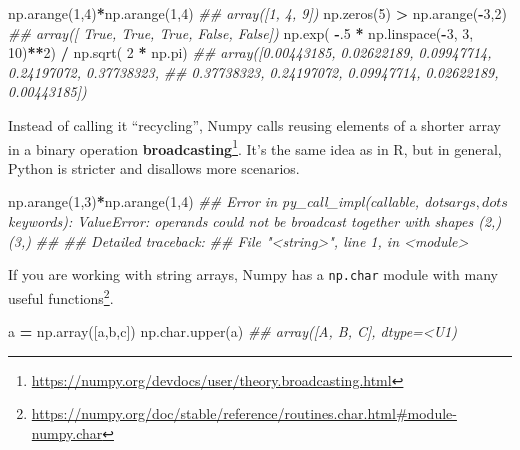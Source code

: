 \documentclass[
  12pt,
]{krantz}
\makeatletter
\newenvironment{Shaded}{\begin{snugshade}}{\end{snugshade}}
\newcommand{\CommentTok}[1]{\textcolor[rgb]{0.37,0.37,0.37}{\textit{#1}}}
\newcommand{\DecValTok}[1]{\textcolor[rgb]{0.06,0.06,0.06}{#1}}
\newcommand{\FloatTok}[1]{\textcolor[rgb]{0.06,0.06,0.06}{#1}}
\newcommand{\NormalTok}[1]{#1}
\newcommand{\OperatorTok}[1]{\textcolor[rgb]{0.43,0.43,0.43}{\textbf{#1}}}
\newcommand{\StringTok}[1]{\textcolor[rgb]{0.5,0.5,0.5}{#1}}
\renewcommand{\href}[2]{#2\footnote{\url{#1}}}
\newenvironment{kframe}{%
\medskip{}
\setlength{\fboxsep}{.8em}
 \def\at@end@of@kframe{}%
 \ifinner\ifhmode%
  \def\at@end@of@kframe{\end{minipage}}%
  \begin{minipage}{\columnwidth}%
 \fi\fi%
 \def\FrameCommand##1{\hskip\@totalleftmargin \hskip-\fboxsep
 \colorbox{shadecolor}{##1}\hskip-\fboxsep
     \hskip-\linewidth \hskip-\@totalleftmargin \hskip\columnwidth}%
 \MakeFramed {\advance\hsize-\width
   \@totalleftmargin\z@ \linewidth\hsize
   \@setminipage}}%
 {\par\unskip\endMakeFramed%
 \at@end@of@kframe}
\renewenvironment{Shaded}{\begin{kframe}}{\end{kframe}}
\makeatother
\begin{document}
\begin{Shaded}
\begin{Highlighting}[]
\NormalTok{np.arange(}\DecValTok{1}\NormalTok{,}\DecValTok{4}\NormalTok{)}\OperatorTok{*}\NormalTok{np.arange(}\DecValTok{1}\NormalTok{,}\DecValTok{4}\NormalTok{)}
\CommentTok{\#\# array([1, 4, 9])}
\NormalTok{np.zeros(}\DecValTok{5}\NormalTok{) }\OperatorTok{\textgreater{}}\NormalTok{ np.arange(}\OperatorTok{{-}}\DecValTok{3}\NormalTok{,}\DecValTok{2}\NormalTok{)}
\CommentTok{\#\# array([ True,  True,  True, False, False])}
\NormalTok{np.exp( }\OperatorTok{{-}}\FloatTok{.5} \OperatorTok{*}\NormalTok{ np.linspace(}\OperatorTok{{-}}\DecValTok{3}\NormalTok{, }\DecValTok{3}\NormalTok{, }\DecValTok{10}\NormalTok{)}\OperatorTok{**}\DecValTok{2}\NormalTok{) }\OperatorTok{/}\NormalTok{ np.sqrt( }\DecValTok{2} \OperatorTok{*}\NormalTok{ np.pi)}
\CommentTok{\#\# array([0.00443185, 0.02622189, 0.09947714, 0.24197072, 0.37738323,}
\CommentTok{\#\#        0.37738323, 0.24197072, 0.09947714, 0.02622189, 0.00443185])}
\end{Highlighting}
\end{Shaded}

Instead of calling it ``recycling'', Numpy calls reusing elements of a shorter array in a binary operation \href{https://numpy.org/devdocs/user/theory.broadcasting.html}{\textbf{broadcasting}}. It's the same idea as in R, but in general, Python is stricter and disallows more scenarios.

\begin{Shaded}
\begin{Highlighting}[]
\NormalTok{np.arange(}\DecValTok{1}\NormalTok{,}\DecValTok{3}\NormalTok{)}\OperatorTok{*}\NormalTok{np.arange(}\DecValTok{1}\NormalTok{,}\DecValTok{4}\NormalTok{)}
\CommentTok{\#\# Error in py\_call\_impl(callable, dots$args, dots$keywords): ValueError: operands could not be broadcast together with shapes (2,) (3,) }
\CommentTok{\#\# }
\CommentTok{\#\# Detailed traceback:}
\CommentTok{\#\#   File "\textless{}string\textgreater{}", line 1, in \textless{}module\textgreater{}}
\end{Highlighting}
\end{Shaded}

If you are working with string arrays, Numpy has a \href{https://numpy.org/doc/stable/reference/routines.char.html\#module-numpy.char}{\texttt{np.char} module with many useful functions}.

\begin{Shaded}
\begin{Highlighting}[]
\NormalTok{a }\OperatorTok{=}\NormalTok{ np.array([}\StringTok{\textquotesingle{}a\textquotesingle{}}\NormalTok{,}\StringTok{\textquotesingle{}b\textquotesingle{}}\NormalTok{,}\StringTok{\textquotesingle{}c\textquotesingle{}}\NormalTok{])}
\NormalTok{np.char.upper(a)}
\CommentTok{\#\# array([\textquotesingle{}A\textquotesingle{}, \textquotesingle{}B\textquotesingle{}, \textquotesingle{}C\textquotesingle{}], dtype=\textquotesingle{}\textless{}U1\textquotesingle{})}
\end{Highlighting}
\end{Shaded}
\end{document}
